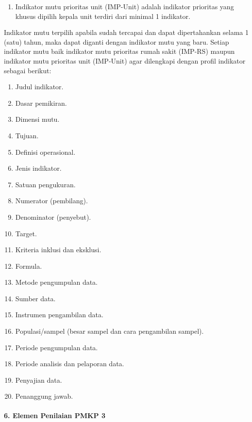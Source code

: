 \documentclass[
]{book}
\providecommand{\tightlist}{%
  \setlength{\itemsep}{0pt}\setlength{\parskip}{0pt}}
\begin{document}
\begin{enumerate}
\def\labelenumi{\alph{enumi}.}
\setcounter{enumi}{2}
\tightlist
\item
  Indikator mutu prioritas unit (IMP-Unit) adalah indikator prioritas yang khusus dipilih kepala unit terdiri dari minimal 1 indikator.
\end{enumerate}

Indikator mutu terpilih apabila sudah tercapai dan dapat dipertahankan selama 1 (satu) tahun, maka dapat diganti dengan indikator mutu yang baru. Setiap indikator mutu baik indikator mutu prioritas rumah sakit (IMP-RS) maupun indikator mutu prioritas unit (IMP-Unit) agar dilengkapi dengan profil indikator sebagai berikut:

\begin{enumerate}
\def\labelenumi{\alph{enumi}.}
\tightlist
\item
  Judul indikator.
\item
  Dasar pemikiran.
\item
  Dimensi mutu.
\item
  Tujuan.
\item
  Definisi operasional.
\item
  Jenis indikator.
\item
  Satuan pengukuran.
\item
  Numerator (pembilang).
\item
  Denominator (penyebut).
\item
  Target.
\item
  Kriteria inklusi dan eksklusi.
\item
  Formula.
\item
  Metode pengumpulan data.
\item
  Sumber data.
\item
  Instrumen pengambilan data.
\item
  Populasi/sampel (besar sampel dan cara pengambilan sampel).
\item
  Periode pengumpulan data.
\item
  Periode analisis dan pelaporan data.
\item
  Penyajian data.
\item
  Penanggung jawab.
\end{enumerate}

\hypertarget{elemen-penilaian-pmkp-3}{%
\paragraph*{6. Elemen Penilaian PMKP 3}\label{elemen-penilaian-pmkp-3}}
\end{document}
